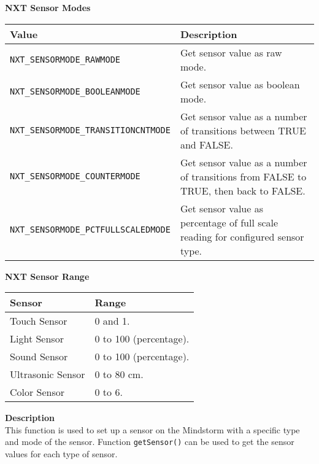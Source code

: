 \noindent
{\bf NXT Sensor Modes}\\
\begin{longtable}{p{6cm}p{9.5cm}}
    \hline
Value & Description\\
\hline
{\tt NXT\_SENSORMODE\_RAWMODE}      &Get sensor value as raw mode.\\	 
{\tt NXT\_SENSORMODE\_BOOLEANMODE}  &Get sensor value as boolean mode.\\
{\tt NXT\_SENSORMODE\_TRANSITIONCNTMODE}  &Get sensor value as a number of transitions between TRUE and FALSE.\\
{\tt NXT\_SENSORMODE\_COUNTERMODE}  &Get sensor value as a number of transitions from FALSE to TRUE, then back to FALSE.\\
{\tt NXT\_SENSORMODE\_PCTFULLSCALEDMODE}  &Get sensor value as percentage of full scale reading for configured sensor type.\\
\hline
\end{longtable}

\noindent
{\bf NXT Sensor Range}\\
\begin{longtable}{p{6cm}p{9.5cm}}
    \hline
    Sensor & Range\\
\hline
Touch Sensor & 0 and 1.\\
Light Sensor & 0 to 100 (percentage).\\
Sound Sensor & 0 to 100 (percentage).\\
Ultrasonic Sensor & 0 to 80 cm.\\
     Color Sensor & 0 to 6.\\
\hline
\end{longtable}

\noindent
{\bf Description}\\
This function is used to set up a sensor on the Mindstorm with a specific type and mode of the sensor. Function {\tt getSensor()} can be used to get the sensor values for each type of sensor.\\

